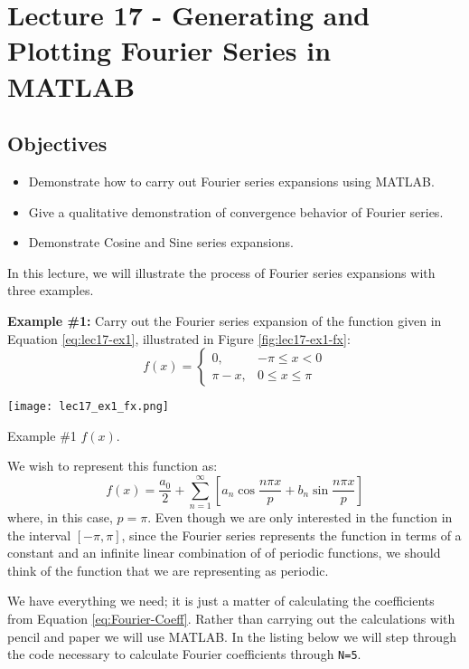 \chapter{Lecture 17 - Generating and Plotting Fourier Series in MATLAB}
\label{ch:lec17}
\section{Objectives}
\begin{itemize}
\item Demonstrate how to carry out Fourier series expansions using MATLAB.
\item Give a qualitative demonstration of convergence behavior of Fourier series.
\item Demonstrate Cosine and Sine series expansions.
\end{itemize}
In this lecture, we will illustrate the process of Fourier series expansions with three examples.

\vspace{0.5cm}

\noindent\textbf{Example \#1:}
Carry out the Fourier series expansion of the function given in Equation \ref{eq:lec17-ex1}, illustrated in Figure \ref{fig:lec17-ex1-fx}:
\begin{equation}
f(x) = 
\begin{cases}
0, & -\pi \le x < 0 \\
\pi - x, & 0 \le x \le \pi
\end{cases}
\label{eq:lec17-ex1}
\end{equation}
\begin{marginfigure}
\texttt{[image: lec17\_ex1\_fx.png]}
\caption{Example \#1 $f(x)$.}
\label{fig:lec17-ex1-fx}
\end{marginfigure}
We wish to represent this function as:
\begin{equation*}
f(x) = \frac{a_0}{2} + \sum\limits_{n=1}^{\infty} \left[a_n \cos{\frac{n \pi x}{p}} + b_n \sin{\frac{n \pi x}{p}} \right]
\end{equation*}
where, in this case, $p = \pi$.  Even though we are only interested in the function in the interval $[-\pi, \pi]$, since the Fourier series represents the function in terms of a constant and an infinite linear combination of of periodic functions, we should think of the function that we are representing as periodic.

We have everything we need; it is just a matter of calculating the coefficients from Equation \ref{eq:Fourier-Coeff}.  Rather than carrying out the calculations with pencil and paper we will use MATLAB.  In the listing below we will step through the code necessary to calculate Fourier coefficients through \lstinline{N=5}.

